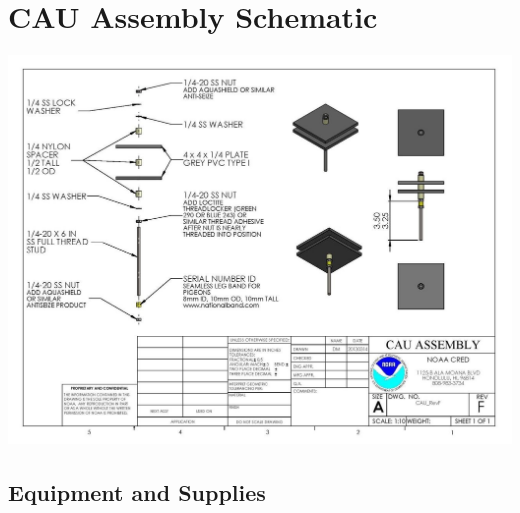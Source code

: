 \documentclass[]{book}
\begin{document}
\hypertarget{cau-assembly-schematic}{%
\section{CAU Assembly Schematic}\label{cau-assembly-schematic}}

\includegraphics{images/CAU_assembly.jpg}

\hypertarget{equipment-and-supplies}{%
\subsection{Equipment and Supplies}\label{equipment-and-supplies}}
\end{document}
